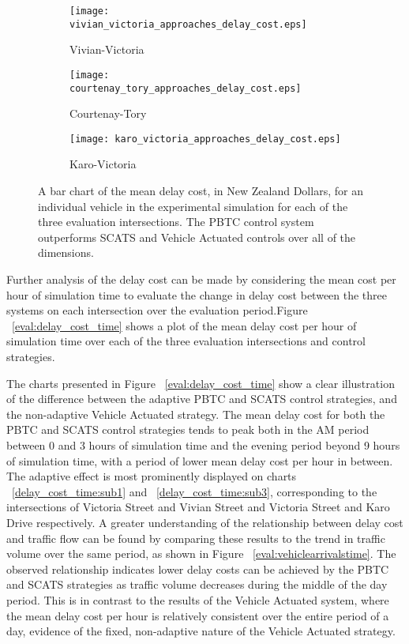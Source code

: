 \begin{figure}
\centering
\begin{subfigure}{.5\textwidth}
  \centering
  \texttt{[image: vivian\_victoria\_approaches\_delay\_cost.eps]}
  \caption{Vivian-Victoria}
  \label{approaches_delay_cost:sub1}
\end{subfigure}%
\begin{subfigure}{.5\textwidth}
  \centering
  \texttt{[image: courtenay\_tory\_approaches\_delay\_cost.eps]}
  \caption{Courtenay-Tory}
  \label{approaches_delay_cost:sub2}
\end{subfigure}

\vspace{1cm}

\begin{subfigure}{.5\textwidth}
  \centering
  \texttt{[image: karo\_victoria\_approaches\_delay\_cost.eps]}
  \caption{Karo-Victoria}
  \label{approaches_delay_cost:sub3}
\end{subfigure}%
\caption{ A bar chart of the mean delay cost, in New Zealand Dollars, for an individual vehicle in the experimental simulation for each of the three evaluation intersections. The PBTC control system outperforms SCATS and Vehicle Actuated controls over all of the dimensions.  }
\label{eval:approaches_delay_cost}
\end{figure}

Further analysis of the delay cost can be made by considering the mean cost per hour of simulation time to evaluate the change in delay cost between the three systems on each intersection over the evaluation period.Figure  ~\ref{eval:delay_cost_time} shows a plot of the mean delay cost per hour of simulation time over each of the three evaluation intersections and control strategies. 

The charts presented in Figure ~\ref{eval:delay_cost_time} show a clear illustration of the difference between the adaptive PBTC and SCATS control strategies, and the non-adaptive Vehicle Actuated strategy. The mean delay cost for both the PBTC and SCATS control strategies tends to peak both in the AM period between 0 and 3 hours of simulation time and the evening period beyond 9 hours of simulation time, with a period of lower mean delay cost per hour in between. The adaptive effect is most prominently displayed on charts ~\ref{delay_cost_time:sub1} and ~\ref{delay_cost_time:sub3}, corresponding to the intersections of Victoria Street and Vivian Street and Victoria Street and Karo Drive respectively. A greater understanding of the relationship between delay cost and traffic flow can be found by comparing these results to the trend in traffic volume over the same period, as shown in Figure ~\ref{eval:vehiclearrivalstime}. The observed relationship indicates lower delay costs can be achieved by the PBTC and SCATS strategies as traffic volume decreases during the middle of the day period. This is in contrast to the results of the Vehicle Actuated system, where the mean delay cost per hour is relatively consistent over the entire period of a day, evidence of the fixed, non-adaptive nature of the Vehicle Actuated strategy.

